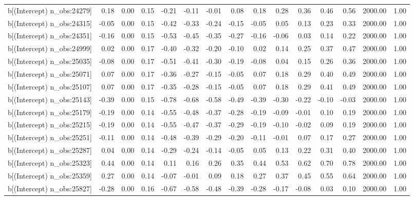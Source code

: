 \begin{table}[ht]
\begin{tabular}{rrrrrrrrrrrrrrr}
  b[(Intercept) n\_obs:24279] & 0.18 & 0.00 & 0.15 & -0.21 & -0.11 & -0.01 & 0.08 & 0.18 & 0.28 & 0.36 & 0.46 & 0.56 & 2000.00 & 1.00 \\ 
  b[(Intercept) n\_obs:24315] & -0.05 & 0.00 & 0.15 & -0.42 & -0.33 & -0.24 & -0.15 & -0.05 & 0.05 & 0.13 & 0.23 & 0.33 & 2000.00 & 1.00 \\ 
  b[(Intercept) n\_obs:24351] & -0.16 & 0.00 & 0.15 & -0.53 & -0.45 & -0.35 & -0.27 & -0.16 & -0.06 & 0.03 & 0.14 & 0.22 & 2000.00 & 1.00 \\ 
  b[(Intercept) n\_obs:24999] & 0.02 & 0.00 & 0.17 & -0.40 & -0.32 & -0.20 & -0.10 & 0.02 & 0.14 & 0.25 & 0.37 & 0.47 & 2000.00 & 1.00 \\ 
  b[(Intercept) n\_obs:25035] & -0.08 & 0.00 & 0.17 & -0.51 & -0.41 & -0.30 & -0.19 & -0.08 & 0.04 & 0.15 & 0.26 & 0.36 & 2000.00 & 1.00 \\ 
  b[(Intercept) n\_obs:25071] & 0.07 & 0.00 & 0.17 & -0.36 & -0.27 & -0.15 & -0.05 & 0.07 & 0.18 & 0.29 & 0.40 & 0.49 & 2000.00 & 1.00 \\ 
  b[(Intercept) n\_obs:25107] & 0.07 & 0.00 & 0.17 & -0.35 & -0.28 & -0.15 & -0.05 & 0.07 & 0.18 & 0.29 & 0.41 & 0.49 & 2000.00 & 1.00 \\ 
  b[(Intercept) n\_obs:25143] & -0.39 & 0.00 & 0.15 & -0.78 & -0.68 & -0.58 & -0.49 & -0.39 & -0.30 & -0.22 & -0.10 & -0.03 & 2000.00 & 1.00 \\ 
  b[(Intercept) n\_obs:25179] & -0.19 & 0.00 & 0.14 & -0.55 & -0.48 & -0.37 & -0.28 & -0.19 & -0.09 & -0.01 & 0.10 & 0.19 & 2000.00 & 1.00 \\ 
  b[(Intercept) n\_obs:25215] & -0.19 & 0.00 & 0.14 & -0.55 & -0.47 & -0.37 & -0.29 & -0.19 & -0.10 & -0.02 & 0.09 & 0.19 & 2000.00 & 1.00 \\ 
  b[(Intercept) n\_obs:25251] & -0.11 & 0.00 & 0.14 & -0.48 & -0.39 & -0.29 & -0.20 & -0.11 & -0.01 & 0.07 & 0.17 & 0.27 & 2000.00 & 1.00 \\ 
  b[(Intercept) n\_obs:25287] & 0.04 & 0.00 & 0.14 & -0.29 & -0.24 & -0.14 & -0.05 & 0.05 & 0.13 & 0.22 & 0.31 & 0.40 & 2000.00 & 1.00 \\ 
  b[(Intercept) n\_obs:25323] & 0.44 & 0.00 & 0.14 & 0.11 & 0.16 & 0.26 & 0.35 & 0.44 & 0.53 & 0.62 & 0.70 & 0.78 & 2000.00 & 1.00 \\ 
  b[(Intercept) n\_obs:25359] & 0.27 & 0.00 & 0.14 & -0.07 & -0.01 & 0.09 & 0.18 & 0.27 & 0.37 & 0.45 & 0.55 & 0.64 & 2000.00 & 1.00 \\ 
  b[(Intercept) n\_obs:25827] & -0.28 & 0.00 & 0.16 & -0.67 & -0.58 & -0.48 & -0.39 & -0.28 & -0.17 & -0.08 & 0.03 & 0.10 & 2000.00 & 1.00 \\ 

\end{tabular}
\end{table}
